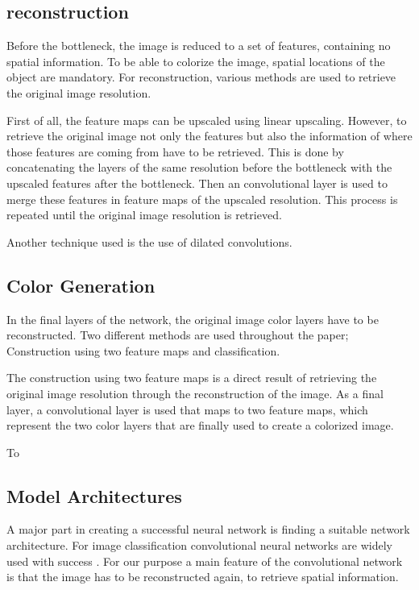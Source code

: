 \subsection{reconstruction}
Before the bottleneck, the image is reduced to a set of features, containing no spatial information. To be able to colorize the image, spatial locations of the object are mandatory. For reconstruction, various methods are used to retrieve the original image resolution.

First of all, the feature maps can be upscaled using linear upscaling. However, to retrieve the original image not only the features but also the information of where those features are coming from have to be retrieved. This is done by concatenating the layers of the same resolution before the bottleneck with the upscaled features after the bottleneck. Then an convolutional layer is used to merge these features in feature maps of the upscaled resolution. This process is repeated until the original image resolution is retrieved.

{\color{red}Another technique used is the use of dilated convolutions.} %

\subsection{Color Generation}
In the final layers of the network, the original image color layers have to be reconstructed. Two different methods are used throughout the paper; Construction using two feature maps and classification.

The construction using two feature maps is a direct result of retrieving the original image resolution through the reconstruction of the image. As a final layer, a convolutional layer is used that maps to two feature maps, which represent the two color layers that are finally used to create a colorized image.

To 





 
\subsection{Model Architectures}
A major part in creating a successful neural network is finding a suitable network architecture. For image classification convolutional neural networks are widely used with success \cite{Krizhevsky,Szegedy,Simonyan}. For our purpose a main feature of the convolutional network is that the image has to be reconstructed again, to retrieve spatial information.

